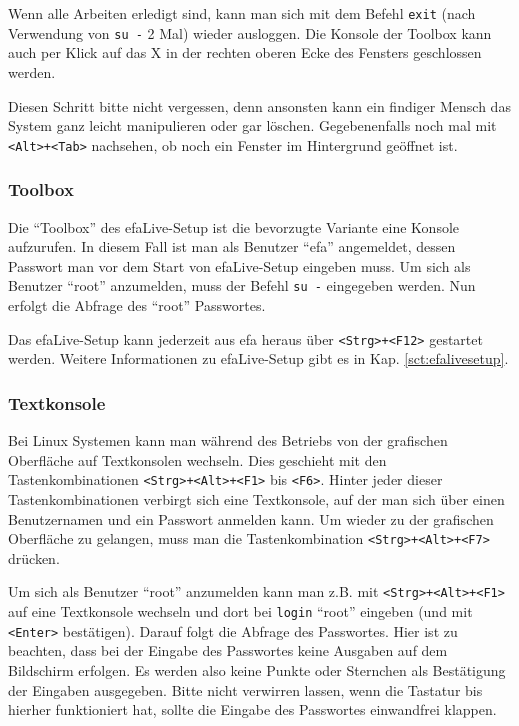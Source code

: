 \documentclass[a4paper,12pt,twoside]{article}
\begin{document}
Wenn alle Arbeiten erledigt sind, kann man sich mit dem Befehl
\texttt{exit} (nach Verwendung von
\texttt{su -} 2 Mal) wieder ausloggen. Die Konsole
der Toolbox kann auch per Klick auf das X in der rechten oberen Ecke
des Fensters geschlossen werden.

Diesen Schritt bitte nicht vergessen, denn ansonsten kann ein findiger
Mensch das System ganz leicht manipulieren oder gar löschen.
Gegebenenfalls noch mal mit
\texttt{{\textless}Alt{\textgreater}+{\textless}Tab{\textgreater}} nachsehen, ob
noch ein Fenster im Hintergrund geöffnet ist.


\subsubsection{Toolbox}
\label{sct:toolbox}
Die "`Toolbox"' des efaLive-Setup ist die
bevorzugte Variante eine Konsole aufzurufen. In diesem Fall ist man als
Benutzer "`efa"' angemeldet, dessen Passwort
man vor dem Start von efaLive-Setup eingeben muss. Um sich als Benutzer
"`root"' anzumelden, muss der Befehl
\texttt{su -} eingegeben werden. Nun erfolgt die
Abfrage des "`root"' Passwortes.

Das efaLive-Setup kann jederzeit aus efa heraus über
\texttt{{\textless}Strg{\textgreater}+{\textless}F12{\textgreater}} gestartet
werden. Weitere Informationen zu efaLive-Setup gibt es in Kap.
\ref{sct:efalivesetup}.


\subsubsection{Textkonsole}
\label{sct:textkonsole}
Bei Linux Systemen kann man während
des Betriebs von der grafischen Oberfläche auf Textkonsolen wechseln.
Dies geschieht mit den Tastenkombinationen
\texttt{{\textless}Strg{\textgreater}+{\textless}Alt{\textgreater}+{\textless}F1{\textgreater}}
bis \texttt{{\textless}F6{\textgreater}}. Hinter jeder dieser
Tastenkombinationen verbirgt sich eine Textkonsole, auf der man sich
über einen Benutzernamen und ein Passwort anmelden kann. Um wieder zu
der grafischen Oberfläche zu gelangen, muss man die Tastenkombination
\texttt{{\textless}Strg{\textgreater}+{\textless}Alt{\textgreater}+{\textless}F7{\textgreater}}
drücken.

Um sich als Benutzer "`root"' anzumelden kann
man z.B. mit
\texttt{{\textless}Strg{\textgreater}+{\textless}Alt{\textgreater}+{\textless}F1{\textgreater}}
auf eine Textkonsole wechseln und dort bei
\texttt{login} "`root"'
eingeben (und mit \texttt{{\textless}Enter{\textgreater}} bestätigen). Darauf
folgt die Abfrage des Passwortes. Hier ist zu beachten, dass bei der
Eingabe des Passwortes keine Ausgaben auf dem Bildschirm erfolgen. Es
werden also keine Punkte oder Sternchen als Bestätigung der Eingaben
ausgegeben. Bitte nicht verwirren lassen, wenn die Tastatur bis hierher
funktioniert hat, sollte die Eingabe des Passwortes einwandfrei
klappen.
\end{document}
